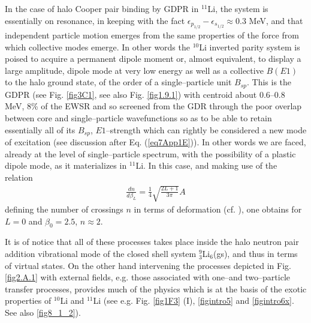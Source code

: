 \begin{subappendices}
In the case of halo Cooper pair binding by GDPR in $^{11}$Li, the system is essentially on resonance, in keeping with the fact $\epsilon_{p_{1/2}}-\epsilon_{s_{1/2}}\approx 0.3$ MeV, and that independent particle motion emerges from the same properties of the force from which collective modes emerge. In other words the $^{10}$Li inverted parity system is poised to acquire a permanent dipole moment or, almost equivalent, to display a large amplitude, dipole mode at very low energy as well as a collective $B(E1)$ to the halo ground state, of the order of a single--particle unit $B_{sp}$. This is the GDPR (see Fig. \ref{fig3C1}, see also Fig. \ref{fig1.9.1}) with centroid about 0.6--0.8 MeV, 8\% of the EWSR and so screened from the GDR through the poor overlap between core and single--particle wavefunctions so as to be able to retain essentially all of its $B_{sp}$, $E1$--strength which can rightly be considered a new mode of excitation (see discussion after Eq. (\ref{eq7App1E})). In other words we are faced, already at the level of single--particle spectrum, with the possibility of a plastic dipole mode, as it materializes in $^{11}$Li. In this case, and making use of the relation 
\begin{align}\label{eq3C6}
\frac{dn}{d\beta_L}=\frac{1}{4}\sqrt{\frac{2L+1}{3\pi}}A
\end{align}  
defining the number of crossings $n$ in terms of deformation (cf. \cite{Bertsch:05}), one obtains for $L=0$ and $\beta_0=2.5$, $n\approx 2$.

 
It is of notice that all of these processes takes place inside the halo neutron pair addition vibrational mode of the closed shell system $^9_3$Li$_6$(gs), and thus in terms of virtual states. On the other hand intervening the processes depicted in Fig. \ref{fig2.A.1} with external fields, e.g. those associated with one--and two--particle transfer processes, provides much of the physics which is at the basis of the exotic properties of $^{10}$Li and $^{11}$Li (see e.g. Fig. \ref{fig1F3} (I), \ref{figintro5} and \ref{figintro6x}. See also \ref{fig8_1_2}). 



\end{subappendices}
